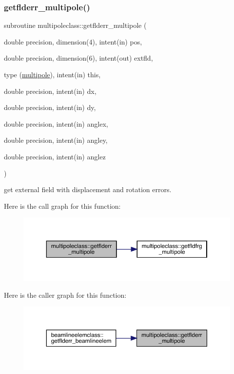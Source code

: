 \subsubsection{\texorpdfstring{getflderr\_multipole()}{getflderr\_multipole()}}
{\footnotesize\ttfamily subroutine multipoleclass\+::getflderr\+\_\+multipole (\begin{DoxyParamCaption}\item[{double precision, dimension(4), intent(in)}]{pos,  }\item[{double precision, dimension(6), intent(out)}]{extfld,  }\item[{type (\mbox{\hyperlink{namespacemultipoleclass_structmultipoleclass_1_1multipole}{multipole}}), intent(in)}]{this,  }\item[{double precision, intent(in)}]{dx,  }\item[{double precision, intent(in)}]{dy,  }\item[{double precision, intent(in)}]{anglex,  }\item[{double precision, intent(in)}]{angley,  }\item[{double precision, intent(in)}]{anglez }\end{DoxyParamCaption})}



get external field with displacement and rotation errors. 

Here is the call graph for this function\+:\nopagebreak
\begin{figure}[H]
\begin{center}
\leavevmode
\includegraphics[width=350pt]{namespacemultipoleclass_ade719df1a7d0e47f6495032cb64b1450_cgraph}
\end{center}
\end{figure}
Here is the caller graph for this function\+:\nopagebreak
\begin{figure}[H]
\begin{center}
\leavevmode
\includegraphics[width=350pt]{namespacemultipoleclass_ade719df1a7d0e47f6495032cb64b1450_icgraph}
\end{center}
\end{figure}
\mbox{\label{namespacemultipoleclass_ab9a8281befade6912e33564f4db52877}} 
